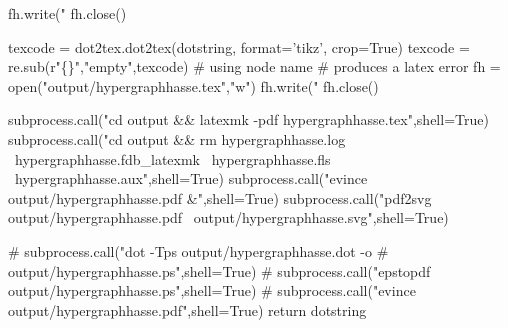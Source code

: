 \begin{python}
    fh.write("%
    fh.close()

    texcode = dot2tex.dot2tex(dotstring, format='tikz', crop=True)
    texcode = re.sub(r"\{\}","empty",texcode) # using node name {}
                                              # produces a latex error
    fh = open("output/hypergraphhasse.tex","w")
    fh.write("%
    fh.close()

    subprocess.call("cd output && latexmk -pdf hypergraphhasse.tex",shell=True)
    subprocess.call("cd output && rm hypergraphhasse.log \
                        hypergraphhasse.fdb_latexmk \
                        hypergraphhasse.fls \
                        hypergraphhasse.aux",shell=True)
    subprocess.call("evince output/hypergraphhasse.pdf &",shell=True)
    subprocess.call("pdf2svg output/hypergraphhasse.pdf \
                             output/hypergraphhasse.svg",shell=True)

    # subprocess.call("dot -Tps output/hypergraphhasse.dot -o
    # output/hypergraphhasse.ps",shell=True)
    # subprocess.call("epstopdf output/hypergraphhasse.ps",shell=True)
    # subprocess.call("evince output/hypergraphhasse.pdf",shell=True)
    return dotstring
\end{python}
